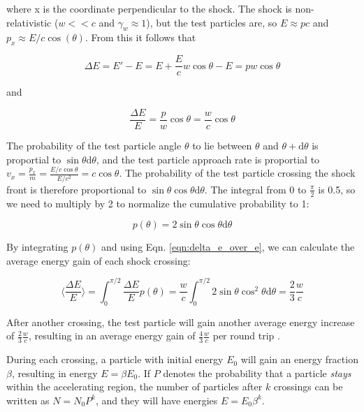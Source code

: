 \documentclass[
    a4paper, %
    fontsize=10pt, %
    twoside=false, %
    numbers=noenddot, %
    fontmethod=tex,
]{kaobook}
\begin{document}
where x is the coordinate perpendicular to the shock. The shock is non-relativistic ($w<<c$ and $\gamma_w\approx1$), but the test particles are, so $E\approx pc$ and $p_x \approx E/c \cos(\theta)$. From this it follows that

\begin{equation}
    \Delta E = E' - E = E+\frac{E}{c}w\cos{\theta}-E = pw\cos{\theta}
\end{equation}

and

\begin{equation}
    \frac{\Delta E}{E} = \frac{p}{w}\cos{\theta} = \frac{w}{c}\cos{\theta}
    \label{eqn:delta_e_over_e}
\end{equation}

The probability of the test particle angle $\theta$ to lie between $\theta$ and $\theta + \text{d}\theta$ is proportial to $\sin{\theta}\text{d}\theta$, and the test particle approach rate is proportial to $v_x = \frac{p_x}{m} = \frac{E/c\cos{\theta}}{E/c^2} = c \cos{\theta}$. The probability of the test particle crossing the shock front is therefore proportional to $\sin{\theta} \cos{\theta} \text{d}\theta$. The integral from 0 to $\frac{\pi}{2}$ is 0.5, so we need to multiply by 2 to normalize the cumulative probability to 1:

\begin{equation}
    p(\theta) = 2\sin{\theta}\cos{\theta} \text{d}\theta
\end{equation}

By integrating $p(\theta)$ and using Eqn. \ref{eqn:delta_e_over_e}, we can calculate the average energy gain of each shock crossing:

\begin{equation}
    \bigg\langle \frac{\Delta E}{E} \bigg\rangle = \int_0^{\pi/2} \frac{\Delta E}{E} p(\theta) = \frac{w}{c} \int_0^{\pi/2} 2 \sin{\theta} \cos^2{\theta}  \text{d}\theta = \frac{2}{3}\frac{w}{c}
\end{equation}

After another crossing, the test particle will gain another average energy increase of $\frac{2}{3}\frac{w}{c}$, resulting in an average energy gain of $\frac{4}{3}\frac{w}{c}$ per round trip \cite{Longair2011}.

During each crossing, a particle with initial energy $E_0$ will gain an energy fraction $\beta$, resulting in energy $E=\beta E_0$. If $P$ denotes the probability that a particle \textit{stays} within the accelerating region, the number of particles after $k$ crossings can be written as $N=N_0 P^k $, and they will have energies $E=E_0\beta^k$.
\end{document}
